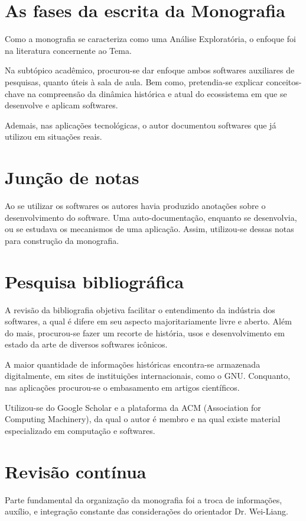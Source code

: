 \documentclass[
12pt,				%
openright,			%
oneside,			%
a4paper,			%
english,			%
french,				%
spanish,			%
brazil,				%
]{abntex2}
\begin{document}
\section{As fases da escrita da Monografia}
Como a monografia se caracteriza como uma Análise Exploratória, o
enfoque foi na literatura concernente ao Tema.

Na subtópico acadêmico, procurou-se dar enfoque ambos softwares auxiliares
de pesquisas, quanto úteis à sala de aula. Bem como, pretendia-se
explicar conceitos-chave na compreensão da dinâmica histórica e atual
do ecossistema em que se desenvolve e aplicam softwares.

Ademais, nas aplicações tecnológicas, o autor documentou softwares que
já utilizou em situações reais.

\section{Junção de notas}
Ao se utilizar os softwares os autores havia produzido anotações sobre
o desenvolvimento do software. Uma auto-documentação, enquanto se
desenvolvia, ou se estudava os mecanismos de uma aplicação. Assim,
utilizou-se dessas notas para construção da monografia.

\section{Pesquisa bibliográfica}
A revisão da bibliografia objetiva facilitar o entendimento da
indústria dos softwares, a qual é difere em seu aspecto
majoritariamente livre e aberto. Além do mais, procurou-se fazer um
recorte de história, usos e desenvolvimento em estado da arte de
diversos softwares icônicos.

A maior quantidade de informações históricas encontra-se armazenada
digitalmente, em sites de instituições internacionais, como o
GNU. Conquanto, nas aplicações procurou-se o embasamento em artigos
científicos.

Utilizou-se do Google Scholar e a plataforma da ACM (Association for
Computing Machinery), da qual o autor é
membro e na qual existe material especializado em computação e softwares.

\section{Revisão contínua}
Parte fundamental da organização da monografia foi a troca de
informações, auxílio, e integração constante das considerações do
orientador Dr. Wei-Liang.
\end{document}
